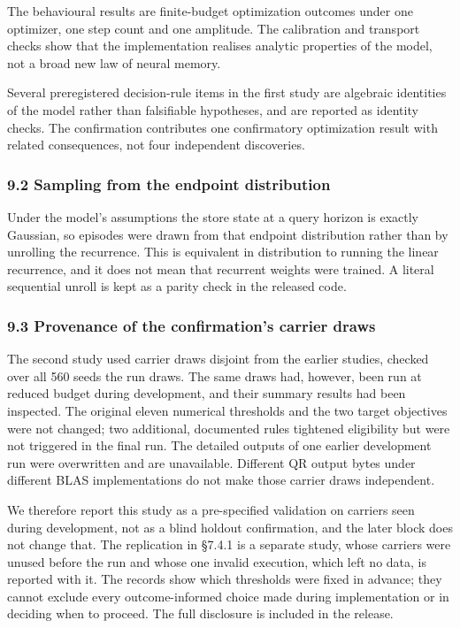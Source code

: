 \documentclass[
  10pt,
]{article}
\begin{document}
The behavioural results are finite-budget optimization outcomes under
one optimizer, one step count and one amplitude. The calibration and
transport checks show that the implementation realises analytic
properties of the model, not a broad new law of neural memory.

Several preregistered decision-rule items in the first study are
algebraic identities of the model rather than falsifiable hypotheses,
and are reported as identity checks. The confirmation contributes one
confirmatory optimization result with related consequences, not four
independent discoveries.

\subsubsection{9.2 Sampling from the endpoint
distribution}\label{sampling-from-the-endpoint-distribution}

Under the model's assumptions the store state at a query horizon is
exactly Gaussian, so episodes were drawn from that endpoint distribution
rather than by unrolling the recurrence. This is equivalent in
distribution to running the linear recurrence, and it does not mean that
recurrent weights were trained. A literal sequential unroll is kept as a
parity check in the released code.

\subsubsection{9.3 Provenance of the confirmation's carrier
draws}\label{provenance-of-the-confirmations-carrier-draws}

The second study used carrier draws disjoint from the earlier studies,
checked over all 560 seeds the run draws. The same draws had, however,
been run at reduced budget during development, and their summary results
had been inspected. The original eleven numerical thresholds and the two
target objectives were not changed; two additional, documented rules
tightened eligibility but were not triggered in the final run. The
detailed outputs of one earlier development run were overwritten and are
unavailable. Different QR output bytes under different BLAS
implementations do not make those carrier draws independent.

We therefore report this study as a pre-specified validation on carriers
seen during development, not as a blind holdout confirmation, and the
later block does not change that. The replication in §7.4.1 is a
separate study, whose carriers were unused before the run and whose one
invalid execution, which left no data, is reported with it. The records
show which thresholds were fixed in advance; they cannot exclude every
outcome-informed choice made during implementation or in deciding when
to proceed. The full disclosure is included in the release.
\end{document}
